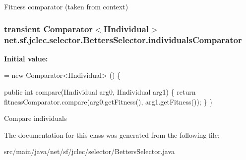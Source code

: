 Fitness comparator (taken from context) \hypertarget{classnet_1_1sf_1_1jclec_1_1selector_1_1_betters_selector_a2fb4bd969e30aba010fdc77798fad6a4}{
\subsubsection[{individuals\-Comparator}]{\setlength{\rightskip}{0pt plus 5cm}transient Comparator$<${\bf I\-Individual}$>$ net.\-sf.\-jclec.\-selector.\-Betters\-Selector.\-individuals\-Comparator\hspace{0.3cm}{\ttfamily [protected]}}}\label{classnet_1_1sf_1_1jclec_1_1selector_1_1_betters_selector_a2fb4bd969e30aba010fdc77798fad6a4}
{\bfseries Initial value\-:}
\begin{DoxyCode}
=  
        \textcolor{keyword}{new} Comparator<IIndividual> () 
        \{
            
        
            \textcolor{keyword}{public} \textcolor{keywordtype}{int} compare(IIndividual arg0, IIndividual arg1) \{
                \textcolor{keywordflow}{return} fitnessComparator.compare(arg0.getFitness(), arg1.getFitness());
            \}
        \}
\end{DoxyCode}
Compare individuals 

The documentation for this class was generated from the following file\-:\begin{DoxyCompactItemize}
\item 
src/main/java/net/sf/jclec/selector/Betters\-Selector.\-java\end{DoxyCompactItemize}
